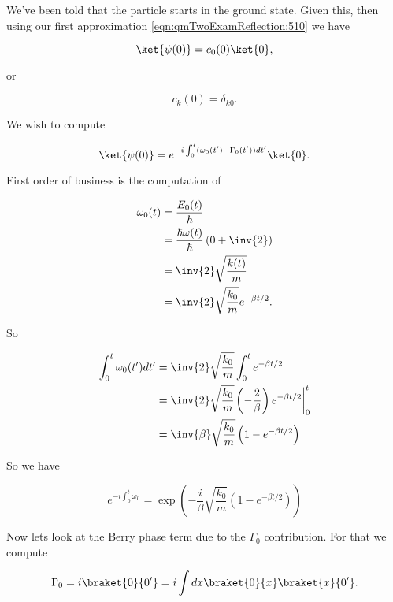 We've been told that the particle starts in the ground state.  Given this, then using our first approximation \ref{eqn:qmTwoExamReflection:510} we have

\begin{equation}\label{eqn:qmTwoExamReflection:730}
\ket{\psi(0)} = c_0(0) \ket{0},
\end{equation}

or

\begin{equation}\label{eqn:qmTwoExamReflection:750}
c_k(0) = \delta_{k 0}.
\end{equation}

We wish to compute

\begin{equation}\label{eqn:qmTwoExamReflection:770}
\ket{\psi(0)} = e^{-i \int_0^t (\omega_0(t') - \Gamma_0(t')) dt'} \ket{0}.
\end{equation}

First order of business is the computation of

\begin{align*}
\omega_0(t) 
&= \frac{E_0(t)}{\hbar} \\
&= \frac{\hbar \omega(t)}{\hbar}\left( 0 + \inv{2} \right) \\
&= \inv{2} \sqrt{\frac{k(t)}{m}} \\
&= \inv{2} \sqrt{\frac{k_0}{m}} e^{-\beta t/2}.
\end{align*}

So

\begin{align*}
\int_0^t \omega_0(t') dt'
&= 
\inv{2} \sqrt{\frac{k_0}{m}} 
\int_0^t e^{-\beta t/2} \\
&= 
\inv{2} \sqrt{\frac{k_0}{m}} 
{\left.{ \left(-\frac{2}{\beta}\right) e^{-\beta t/2} }\right\vert}_0^t \\
&= 
\inv{\beta} \sqrt{\frac{k_0}{m}} 
\left( 1 - e^{-\beta t/2} \right)
\end{align*}

So we have

\begin{equation}\label{eqn:qmTwoExamReflection:790}
e^{-i \int_0^t \omega_0}
=
\exp\left(
- \frac{i}{\beta} \sqrt{\frac{k_0}{m}} 
\left( 1 - e^{-\beta t/2} \right)
\right)
\end{equation}

Now lets look at the Berry phase term due to the $\Gamma_0$ contribution.  For that we compute

\begin{equation}\label{eqn:qmTwoExamReflection:850}
\Gamma_0 
= i \braket{0}{0'} 
= i \int dx \braket{0}{x} \braket{x}{0'}.
\end{equation}

